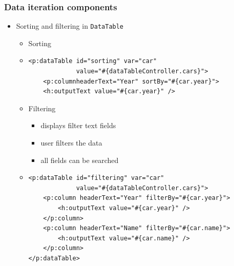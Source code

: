 \documentclass[10pt,xcolor=pdflatex]{beamer}
\begin{document}
\begin{frame}[containsverbatim]\frametitle{Data iteration components}
  \begin{itemize}
    \item Sorting and filtering in \texttt{DataTable}
	  \begin{itemize}
		\item Sorting
        \item[] \begin{footnotesize} \begin{verbatim}
<p:dataTable id="sorting" var="car" 
             value="#{dataTableController.cars}">
    <p:columnheaderText="Year" sortBy="#{car.year}">
    <h:outputText value="#{car.year}" />     
        	\end{verbatim} \end{footnotesize}
        \item Filtering
          \begin{itemize}
            \item displays filter text fields
	        \item user filters the data
	        \item all fields can be searched
          \end{itemize}
        \item[] \begin{footnotesize} \begin{verbatim}
<p:dataTable id="filtering" var="car" 
             value="#{dataTableController.cars}">
    <p:column headerText="Year" filterBy="#{car.year}">
        <h:outputText value="#{car.year}" />
    </p:column>
    <p:column headerText="Name" filterBy="#{car.name}">
        <h:outputText value="#{car.name}" />
    </p:column>
</p:dataTable>    	
    	\end{verbatim} \end{footnotesize}
    \end{itemize}
  \end{itemize}
\end{frame}
\end{document}
